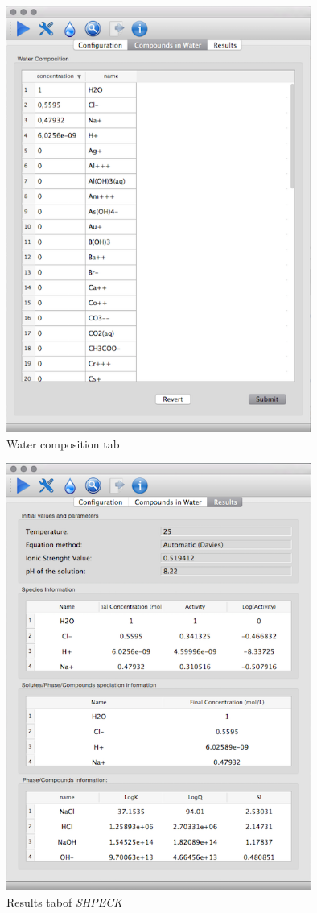 \documentclass[preprint,12pt,3p]{elsarticle}
\begin{document}
\begin{figure}[ht!]
\centering
\includegraphics[width=100mm]{shpeck-watertab.png}
\caption{Water composition tab}
\label{fig:water}
\end{figure}

\begin{figure}[ht!]
\centering
\includegraphics[width=100mm]{shpeck-resultstab.png}
\caption{Results tabof \emph{SHPECK}}
\label{fig:output}
\end{figure}
\end{document}
